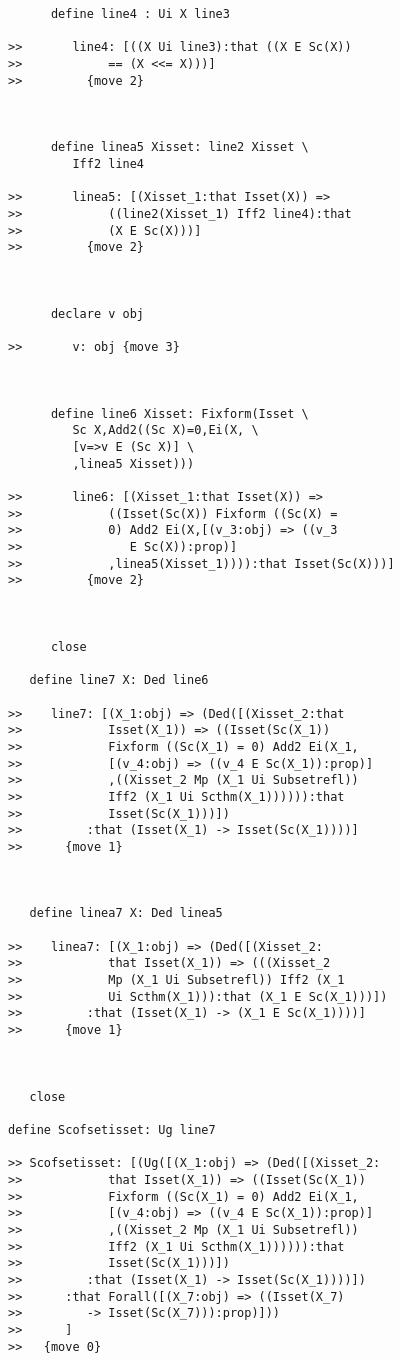 \documentclass[12pt]{article}
\begin{document}
\begin{verbatim}
      define line4 : Ui X line3

>>       line4: [((X Ui line3):that ((X E Sc(X))
>>            == (X <<= X)))]
>>         {move 2}



      define linea5 Xisset: line2 Xisset \
         Iff2 line4

>>       linea5: [(Xisset_1:that Isset(X)) =>
>>            ((line2(Xisset_1) Iff2 line4):that
>>            (X E Sc(X)))]
>>         {move 2}



      declare v obj

>>       v: obj {move 3}



      define line6 Xisset: Fixform(Isset \
         Sc X,Add2((Sc X)=0,Ei(X, \
         [v=>v E (Sc X)] \
         ,linea5 Xisset)))

>>       line6: [(Xisset_1:that Isset(X)) =>
>>            ((Isset(Sc(X)) Fixform ((Sc(X) =
>>            0) Add2 Ei(X,[(v_3:obj) => ((v_3
>>               E Sc(X)):prop)]
>>            ,linea5(Xisset_1)))):that Isset(Sc(X)))]
>>         {move 2}



      close

   define line7 X: Ded line6

>>    line7: [(X_1:obj) => (Ded([(Xisset_2:that
>>            Isset(X_1)) => ((Isset(Sc(X_1))
>>            Fixform ((Sc(X_1) = 0) Add2 Ei(X_1,
>>            [(v_4:obj) => ((v_4 E Sc(X_1)):prop)]
>>            ,((Xisset_2 Mp (X_1 Ui Subsetrefl))
>>            Iff2 (X_1 Ui Scthm(X_1)))))):that
>>            Isset(Sc(X_1)))])
>>         :that (Isset(X_1) -> Isset(Sc(X_1))))]
>>      {move 1}



   define linea7 X: Ded linea5

>>    linea7: [(X_1:obj) => (Ded([(Xisset_2:
>>            that Isset(X_1)) => (((Xisset_2
>>            Mp (X_1 Ui Subsetrefl)) Iff2 (X_1
>>            Ui Scthm(X_1))):that (X_1 E Sc(X_1)))])
>>         :that (Isset(X_1) -> (X_1 E Sc(X_1))))]
>>      {move 1}



   close

define Scofsetisset: Ug line7

>> Scofsetisset: [(Ug([(X_1:obj) => (Ded([(Xisset_2:
>>            that Isset(X_1)) => ((Isset(Sc(X_1))
>>            Fixform ((Sc(X_1) = 0) Add2 Ei(X_1,
>>            [(v_4:obj) => ((v_4 E Sc(X_1)):prop)]
>>            ,((Xisset_2 Mp (X_1 Ui Subsetrefl))
>>            Iff2 (X_1 Ui Scthm(X_1)))))):that
>>            Isset(Sc(X_1)))])
>>         :that (Isset(X_1) -> Isset(Sc(X_1))))])
>>      :that Forall([(X_7:obj) => ((Isset(X_7)
>>         -> Isset(Sc(X_7))):prop)]))
>>      ]
>>   {move 0}




\end{verbatim}
\end{document}

